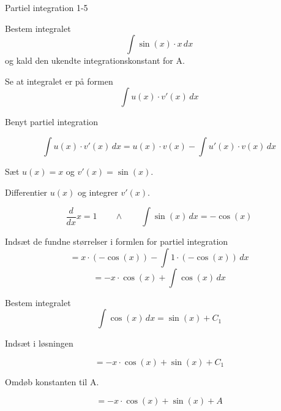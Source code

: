\documentclass{article}
\begin{document}
\begin{exercise}{Partiel integration 1-5}


Bestem integralet
\[
\int \sin(x) \cdot x \, dx
\]
og kald den ukendte integrationskonstant for A.



\hint

Se at integralet er på formen
\[
\int u(x) \cdot v'(x) \, dx
\]

\hint

Benyt partiel integration

\hint
\[
\int u(x) \cdot v'(x)\, dx = u(x) \cdot v(x) - \int u'(x) \cdot v(x) \, dx
\]
\hint

Sæt $u(x) = x$ og $v'(x) = \sin(x)$.


\hint

Differentier $u(x)$ og integrer $v'(x)$.

\hint
\[
\frac{d}{dx}x = 1 \qquad \wedge \qquad \int \sin(x) \, dx = - \cos(x)
\]

\hint

Indsæt de fundne størrelser i formlen for partiel integration
\[
= x \cdot (- \cos(x))- \int 1 \cdot (- \cos(x)) \, dx
\]
\[
= -x \cdot \cos(x)+ \int \cos(x) \, dx
\]

\hint

Bestem integralet
\[
\int \cos(x) \, dx = \sin(x) + C_1
\]

\hint
Indsæt i løsningen

\hint

\[
= -x \cdot \cos(x) + \sin(x) + C_1
\]

\hint

Omdøb konstanten til A.

\hint

\[
= -x \cdot \cos(x) + \sin(x) + A
\]


\end{exercise}

\newpage
\end{document}

